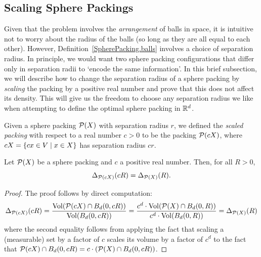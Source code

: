 \subsection{Scaling Sphere Packings}

Given that the problem involves the \emph{arrangement} of balls in space, it is intuitive not to worry about the radius of the balls (so long as they are all equal to each other). However, Definition~\ref{SpherePacking.balls} involves a choice of separation radius. In principle, we would want two sphere packing configurations that differ only in separation radii to `encode the same information'. In this brief subsection, we will describe how to change the separation radius of a sphere packing by \emph{scaling} the packing by a positive real number and prove that this does not affect its density. This will give us the freedom to choose any separation radius we like when attempting to define the optimal sphere packing in $\mathbb{R}^d$.

\begin{definition}\label{SpherePacking.scale}\leanok
  Given a sphere packing $\mathcal{P}(X)$ with separation radius $r$, we defined the \emph{scaled packing} with respect to a real number $c > 0$ to be the packing $\mathcal{P}(cX)$, where $cX = \left\{ cx \in V \; \middle| \; x \in X \right\}$ has separation radius $cr$.
\end{definition}

\begin{lemma}\label{SpherePacking.scale_finiteDensity}\leanok
  Let $\mathcal{P}(X)$ be a sphere packing and $c$ a positive real number. Then, for all $R > 0$,
  \[
    \Delta_{\mathcal{P}(cX)}(cR) = \Delta_{\mathcal{P}(X)}(R).
  \]
\end{lemma}
\begin{proof}\leanok
  The proof follows by direct computation:
  \[
    \Delta_{\mathcal{P}(cX)}(cR) = \frac{\operatorname{Vol}\!\left(\mathcal{P}(cX) \cap B_d(0, cR)\right)}{\operatorname{Vol}\!\left(B_d(0, cR)\right)} = \frac{c^d \cdot \operatorname{Vol}\!\left(\mathcal{P}(X) \cap B_d(0, R)\right)}{c^d \cdot \operatorname{Vol}\!\left(B_d(0, R)\right)}
    = \Delta_{\mathcal{P}(X)}(R)
  \]
  where the second equality follows from applying the fact that scaling a (measurable) set by a factor of $c$ scales its volume by a factor of $c^d$ to the fact that $\mathcal{P}(cX) \cap B_d(0, cR) = c \cdot (\mathcal{P}(X) \cap B_d(0, cR))$.
\end{proof}

